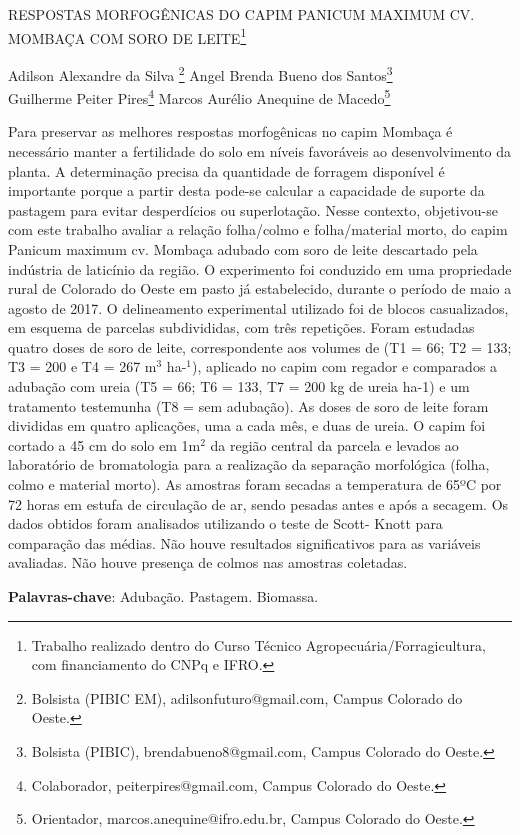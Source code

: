 \documentclass[article,12pt,onesidea,4paper,english,brazil]{abntex2}
\begin{document}
	
	
	\frenchspacing 
	
	\begin{center}
		\LARGE \MakeUppercase{Respostas morfogênicas do capim Panicum maximum cv. Mombaça com soro de leite}\footnote{Trabalho realizado dentro do Curso Técnico Agropecuária/Forragicultura, com financiamento do CNPq e IFRO.}
		
		\normalsize
	Adilson Alexandre da Silva	\footnote{Bolsista (PIBIC EM), adilsonfuturo@gmail.com, Campus Colorado do Oeste.} 
		Angel Brenda Bueno dos Santos\footnote{Bolsista (PIBIC), brendabueno8@gmail.com, Campus Colorado do Oeste.} \\
		Guilherme Peiter Pires\footnote{Colaborador, peiterpires@gmail.com, Campus Colorado do Oeste.} 
	Marcos Aurélio Anequine de Macedo\footnote{Orientador, marcos.anequine@ifro.edu.br, Campus Colorado do Oeste.} 
	\end{center}
	
	\noindent Para preservar as melhores respostas morfogênicas no capim Mombaça é necessário manter a fertilidade do solo em níveis favoráveis ao desenvolvimento da planta. A determinação precisa da quantidade de forragem disponível é importante porque a partir desta pode-se calcular a capacidade de suporte da pastagem para evitar desperdícios ou superlotação. Nesse contexto, objetivou-se com este trabalho avaliar a relação folha/colmo e folha/material morto, do capim Panicum maximum cv. Mombaça adubado com soro de leite descartado pela indústria de laticínio da região. O experimento foi conduzido em uma propriedade rural de Colorado do Oeste em pasto já estabelecido, durante o período de maio a agosto de 2017. O delineamento experimental utilizado foi de blocos casualizados, em esquema de parcelas subdivididas, com três repetições. Foram estudadas quatro doses de soro de leite, correspondente aos volumes de (T1 = 66; T2 = 133; T3 = 200 e T4 = 267 m$^3$ ha-$^1$), aplicado no capim com regador e comparados a adubação com ureia (T5 = 66; T6 = 133, T7 = 200 kg de ureia ha-1) e um tratamento testemunha (T8 = sem adubação). As doses de soro de leite foram divididas em quatro aplicações, uma a cada mês, e duas de ureia. O capim foi cortado a 45 cm do solo em 1m$^2$ da região central da parcela e levados ao laboratório de bromatologia para a realização da separação morfológica (folha, colmo e material morto). As amostras foram secadas a temperatura de 65ºC por 72 horas em estufa de circulação de ar, sendo pesadas antes e após a secagem. Os dados obtidos foram analisados utilizando o teste de Scott- Knott para comparação das médias. Não houve resultados significativos para as variáveis avaliadas. Não houve presença de colmos nas amostras coletadas.
	
	\vspace{\onelineskip}
	
	\noindent
	\textbf{Palavras-chave}: Adubação. Pastagem. Biomassa.
	
\end{document}
